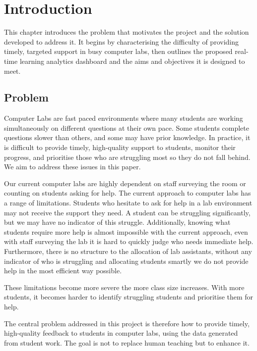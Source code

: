 \section{Introduction} \label{sec: intro}

This chapter introduces the problem that motivates the project and the solution developed to address it. 
It begins by characterising the difficulty of providing timely, targeted support in busy computer labs, then outlines the proposed real-time learning analytics dashboard and the aims and objectives it is designed to meet.


\subsection{Problem}

Computer Labs are fast paced environments where many students are working simultaneously on different questions at their own pace.
Some students complete questions slower than others, and some may have prior knowledge.
In practice, it is difficult to provide timely, high-quality support to students, monitor their progress, and prioritise those who are struggling most so they do not fall behind. We aim to address these issues in this paper.

Our current computer labs are highly dependent on staff surveying the room or counting on students asking for help.
The current approach to computer labs has a range of limitations.
Students who hesitate to ask for help in a lab environment may not receive the support they need.
A student can be struggling significantly, but we may have no indicator of this struggle.
Additionally, knowing what students require more help is almost impossible with the current approach, even with staff surveying the lab it is hard to quickly judge who needs immediate help.
Furthermore, there is no structure to the allocation of lab assistants, without any indicator of who is struggling and allocating students smartly we do not provide help in the most efficient way possible.

These limitations become more severe the more class size increases.
With more students, it becomes harder to identify struggling students and prioritise them for help.

The central problem addressed in this project is therefore how to provide timely, high-quality feedback to students in computer labs, using the data generated from student work.
The goal is not to replace human teaching but to enhance it.

